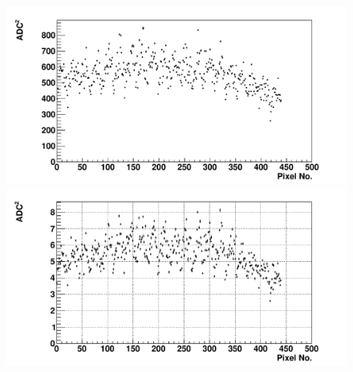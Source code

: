 \begin{figure} %
\includegraphics[width=\textwidth]{chapters/graphs/GainVarsMeas/LL_m04_2016-06-11/Set0and2/varianceHist_StandHV_Pairs_set0and2.pdf}
\caption{}
\vspace{3mm}
\includegraphics[width=\textwidth]{chapters/graphs/GainVarsMeas/LL_m04_2016-06-11/Set0and2/varianceHist_LowHV_Pairs_set0and2.pdf}
\caption{}
\end{figure}

